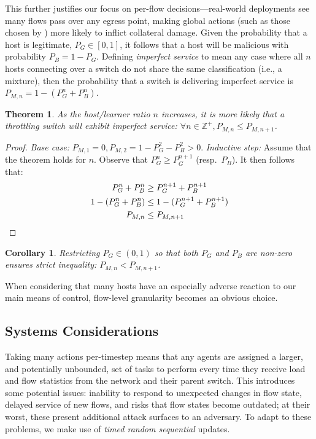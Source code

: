 \documentclass[10pt, times, comsoc]{IEEEtran}
\newtheorem{thm}{Theorem}
\newtheorem{corr}{Corollary}[thm]
\begin{document}
This further justifies our focus on per-flow decisions---real-world deployments see many flows pass over any egress point, making global actions (such as those chosen by \textcite{DBLP:journals/eaai/MalialisK15}) more likely to inflict collateral damage.
Given the probability that a host is legitimate, $P_G \in [0,1]$, it follows that a host will be malicious with probability $P_B = 1 - P_G$.
Defining \emph{imperfect service} to mean any case where all $n$ hosts connecting over a switch do not share the same classification (i.e., a mixture), then the probability that a switch is delivering imperfect service is $P_{M,n} = 1 - (P_G^n + P_B^n)$.
\begin{thm}
	As the host/learner ratio $n$ increases, it is more likely that a throttling switch will exhibit imperfect service: $\forall n \in \mathbb{Z}^{+}, P_{M,n} \le P_{M,n+1}$.
\end{thm}
\begin{proof}
	\emph{Base case:} $P_{M,1}=0, P_{M,2} = 1 - P_G^2 - P_B^2 > 0$.
	\emph{Inductive step:} Assume that the theorem holds for $n$. Observe that $P_G^n \ge P_G^{n+1}$ (resp.\ $P_B$). It then follows that:
	\begin{align*}
	P_G^n + P_B^n &\ge P_G^{n+1} + P_B^{n+1}\\
	1 - (P_G^n + P_B^n) &\le 1 - (P_G^{n+1} + P_B^{n+1})\\
	P_{M,n} &\le P_{M,n+1} \qedhere
	\end{align*}
\end{proof}
\begin{corr}
	Restricting $P_G \in (0,1)$ so that both $P_G$ and $P_B$ are non-zero ensures strict inequality: $P_{M,n} < P_{M,n+1}$.
\end{corr}
When considering that many hosts have an especially adverse reaction to our main means of control, flow-level granularity becomes an obvious choice.

\subsection{Systems Considerations}
Taking many actions per-timestep means that any agents are assigned a larger, and potentially unbounded, set of tasks to perform every time they receive load and flow statistics from the network and their parent switch.
This introduces some potential issues: inability to respond to unexpected changes in flow state, delayed service of new flows, and risks that flow states become outdated; at their worst, these present additional attack surfaces to an adversary.
To adapt to these problems, we make use of \emph{timed random sequential} updates.
\end{document}
